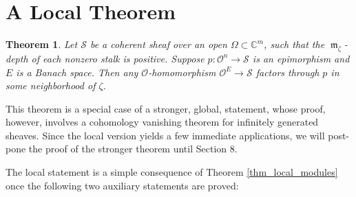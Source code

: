 \documentclass{amsart}
\numberwithin{equation}{section}
\theoremstyle{definition}
\theoremstyle{plain}
\newtheorem{theorem}[definition]{Theorem}
\theoremstyle{remark}
\begin{document}
\section{ A Local Theorem }
\begin{theorem}\label{thm_local_thm}
Let ${\ensuremath{\mathcal{{S}}}}$ be a coherent sheaf over an open $\Omega\subset\mathbb{C}^m$,
such that the ${{\mathop{\mathfrak{m}}}}_\zeta$-depth of each nonzero stalk is positive.
Suppose $p:{\ensuremath{\mathcal{{O}}}}^n\rightarrow {\ensuremath{\mathcal{{S}}}}$ is an epimorphism
and $E$ is a Banach space.
Then 
any ${\ensuremath{\mathcal{{O}}}}$-homomorphism ${\ensuremath{\mathcal{{O}}}}^E\rightarrow{\ensuremath{\mathcal{{S}}}}$
factors 
through $p$ in some neighborhood of $\zeta$. 
\end{theorem}
This theorem is a special case of a stronger, global, statement,
whose proof, however, involves a cohomology vanishing theorem for
infinitely generated sheaves.
Since the local version yields a few immediate applications, we will post-pone
the proof of the stronger theorem until Section 8.

The local statement is a simple consequence of Theorem \ref{thm_local_modules}
once the following two auxiliary statements are proved:
\end{document}

